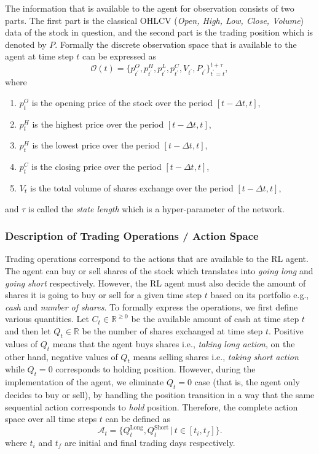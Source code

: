 \documentclass[twocolumn,aps,pra,superscriptaddress,nofootinbib,longbibliography]{revtex4-2}
\begin{document}
The information that is available to the agent for observation consists of two parts. The first part is the classical OHLCV (\textit{Open, High, Low, Close, Volume}) data of the stock in question, and the second part is the trading position which is denoted by \(P\). 
Formally the discrete observation space that is available to the agent at time step \(t\) can be expressed as 
\begin{equation}
    \mathcal{O}(t) = \{p_{t^{\prime}}^O, p_{t^{\prime}}^H, p_{t^{\prime}}^L, p_{t^{\prime}}^C, V_{t^{\prime}}, P_{t^{\prime}}\}_{t^{\prime} = t}^{t + \tau},
\end{equation}
where 
\begin{enumerate}[-]
    \item \(p_t^O\) is the opening price of the stock over the period \([t - \Delta t, t]\),
    \item \(p_t^H\) is the highest price over the period \([t - \Delta t, t]\),
    \item \(p_t^H\) is the lowest price over the period \([t - \Delta t, t]\),
    \item \(p_t^C\) is the closing price over the period \([t - \Delta t, t]\),
    \item \(V_t\) is the total volume of shares exchange over the period \([t - \Delta t, t]\),
\end{enumerate}
and \(\tau\) is called the \textit{state length} which is a hyper-parameter of the network. 

\subsubsection{Description of Trading Operations / Action Space}
Trading operations correspond to the actions that are available to the RL agent. The agent can buy or sell shares of the stock which translates into \textit{going long} and \textit{going short} respectively.  However, the RL agent must also decide the amount of shares it is going to buy or sell for a given time step \(t\) based on its portfolio e.g., \textit{cash} and \textit{number of shares}. To formally express the operations, we first define various quantities. Let \(C_{t} \in \mathds{R}^{\geq 0}\) be the available amount of cash at time step \(t\) and then let \(Q_t \in \mathds{R}\) be the number of shares exchanged at time step \(t\). Positive values of \(Q_t\) means that the agent buys shares i.e., \textit{taking long action}, on the other hand, negative values of \(Q_t\) means selling shares i.e., \textit{taking short action} while \(Q_t = 0\) corresponds to holding position. However, during the implementation of the agent, we eliminate \(Q_t = 0\) case (that is, the agent only decides to buy or sell), by handling the position transition in a way that the same sequential action corresponds to \textit{hold} position. Therefore, the complete action space over all time steps \(t\) can be defined as
\begin{equation}
    \mathcal{A}_t = \{Q^{\text{Long}}_{t}, Q^{\text{Short}}_{t} \,| \, t \in [t_i, t_f]\}.
\end{equation}
where \(t_i\) and \(t_f\) are initial and final trading days respectively.
\end{document}
